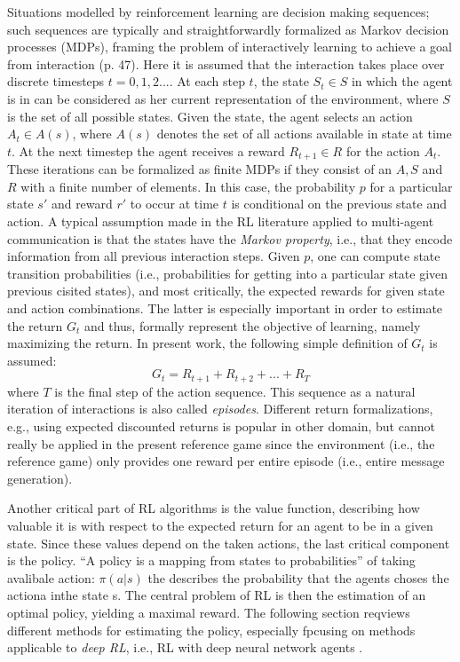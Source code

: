 Situations modelled by reinforcement learning are decision making sequences; such sequences are typically and straightforwardly formalized as Markov decision processes (MDPs), framing the problem of interactively learning to achieve a goal from interaction (p. 47). Here it is assumed that the interaction takes place over discrete timesteps $t = 0, 1,2 ...$. At each step $t$, the state $S_t \in S$ in which the agent is in can be considered as her current representation of the environment, where $S$ is the set of all possible states. Given the state, the agent selects an action $A_t \in A(s)$, where $A(s)$ denotes the set of all actions available in state at time $t$. At the next timestep the agent receives a reward $R_{t+1} \in R$ for the action $A_t$. These iterations can be formalized as finite MDPs if they consist of an $A, S$ and $R$ with a finite number of elements. In this case, the probability $p$ for a particular state $s'$ and reward $r'$ to occur at time $t$ is conditional on the previous state and action. A typical assumption made in the RL literature applied to multi-agent communication is that the states have the \textit{Markov property}, i.e., that they encode information from all previous interaction steps. Given $p$, one can compute state transition probabilities (i.e., probabilities for getting into a particular state given previous cisited states), and most critically, the expected rewards for given state and action combinations. The latter is especially important in order to estimate the return $G_t$ and thus, formally represent the objective of learning, namely maximizing the return. In present work, the following simple definition of $G_t$ is assumed: 
$$G_t = R_{t+1} + R_{t+2} + ... + R_T$$ where $T$ is the final step of the action sequence. This sequence as a natural iteration of interactions is also called \textit{episodes}.  Different return formalizations, e.g., using expected discounted returns is popular in other domain, but cannot really be applied in the present reference game since the environment (i.e., the reference game) only provides one reward per entire episode (i.e., entire message generation). 

Another critical part of RL algorithms is the value function, describing how valuable it is with respect to the expected return for an agent to be in a given state. Since these values depend on the taken actions, the last critical component is the policy. ``A policy is a mapping from states to probabilities'' of taking avalibale action: $\pi(a | s)$ the describes the probability that the agents choses the actiona inthe state s. The central problem of RL is then the estimation of an optimal policy, yielding a maximal reward. The following section reqviews different methods for estimating the policy, especially fpcusing on methods applicable to \textit{deep RL}, i.e., RL with deep neural network agents \parencite{lecun2015deep}.

